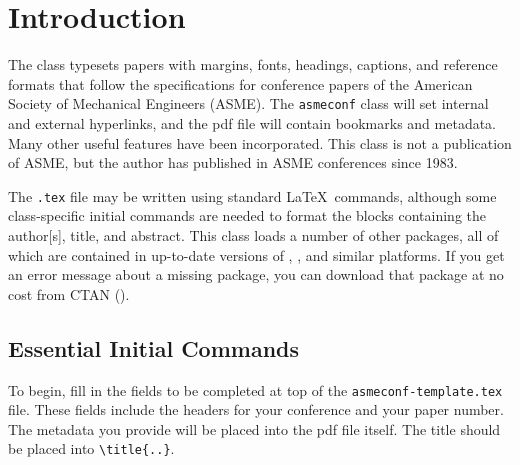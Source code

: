 \documentclass[colorlinks,upint,subscriptcorrection,varvw,balance,loadscripts,german,vietamese]{asmeconf} %
\begin{document}
\begin{nomenclature}



\end{nomenclature}


\section{Introduction}
The \texttt{} class typesets papers with margins, fonts, headings, captions, and reference formats that follow the specifications for conference papers of the American Society of Mechanical Engineers (ASME). The \texttt{asmeconf} class will set internal and external hyperlinks, and the pdf file will contain bookmarks and metadata. Many other useful features have been incorporated. This class is not a publication of ASME, but the author has published in ASME conferences since 1983. 

The \texttt{.tex} file may be written using standard \LaTeX\ commands, although some class-specific initial commands are needed to format the blocks containing the author[s], title, and abstract.  This class loads a number of other packages, all of which are contained in up-to-date versions of , , and similar platforms. If you get an error message about a missing package, you can download that package at no cost from CTAN (). 

\subsection{Essential Initial Commands}

To begin, fill in the fields to be completed at top of the \texttt{asmeconf-template.tex} file. These fields include the headers for your conference and your paper number. The metadata you provide will be placed into the pdf file itself. 
The title should be placed into \verb|\title{..}|. 
\end{document}
